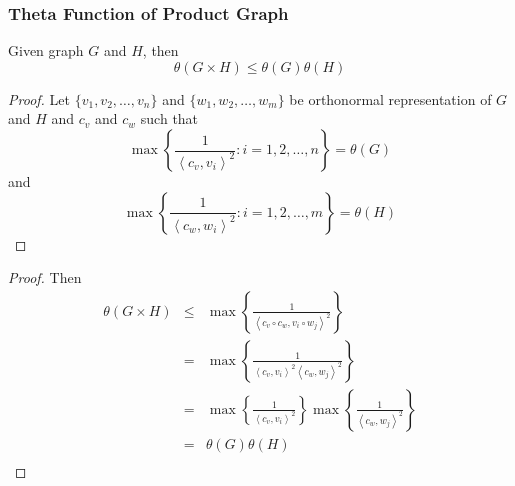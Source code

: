       \begin{frame}
            \frametitle{Theta Function of Product Graph}
            \begin{lemma}
                  Given graph $ G $ and $ H $, then
                  \begin{equation}
                        \theta(G \times H) \leq \theta(G) \theta(H)
                  \end{equation}
            \end{lemma}

            \pause

            \begin{proof}
                  Let $ \{v_1, v_2, \dots, v_n\} $ and $ \{w_1, w_2, \dots, w_m\} $ be orthonormal representation of $ G $ and $ H $ and $ c_{v} $ and $ c_{w} $ such that
                  \begin{equation}
                        \max \left\{ \frac{1}{\left<c_{v},v_{i}\right>^2} : i=1,2,\dots,n \right\} = \theta(G)
                  \end{equation} 
                  and 
                  \begin{equation}
                        \max \left\{ \frac{1}{\left<c_{w},w_{i}\right>^2} : i=1,2,\dots,m \right\} = \theta(H)
                  \end{equation}
            \end{proof}
      \end{frame}

      \begin{frame}
            \begin{proof}
                  Then
                  \begin{eqnarray}
                        \theta(G \times H) &\leq& 
                        \max \left\{ \frac{1}{\left<c_{v} \circ c_{w},v_{i} \circ w_{j}\right>^2} \right\} \\
                        &=& \max \left\{ \frac{1}{\left<c_{v},v_{i}\right>^2 \left<c_{w},w_{j}\right>^2} \right\} \\
                        &=& \max \left\{ \frac{1}{\left<c_{v},v_{i}\right>^2} \right\} \max \left\{ \frac{1}{\left<c_{w},w_{j}\right>^2} \right\} \\
                        &=& \theta(G) \theta(H) \\
                  \end{eqnarray}
            \end{proof}
      \end{frame}

